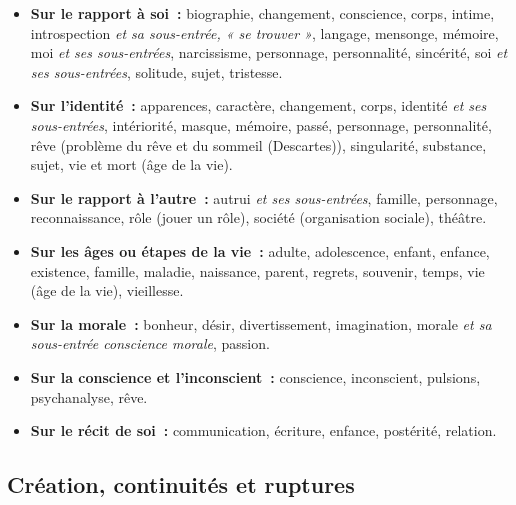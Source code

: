 \begin{itemize}\setlength{\itemsep}{6pt}

\item \textbf{Sur le rapport à soi~:} biographie, changement, conscience, corps, intime, introspection \textit{et sa sous-entrée, « se trouver »}, langage, mensonge, mémoire, moi \textit{et ses sous-entrées}, narcissisme, personnage, personnalité, sincérité, soi \textit{et ses sous-entrées}, solitude, sujet, tristesse.

\item \textbf{Sur l'identité~:} apparences, caractère, changement, corps, identité \textit{et ses sous-entrées}, intériorité, masque, mémoire, passé, personnage, personnalité, rêve (problème du rêve et du sommeil (Descartes)), singularité, substance, sujet, vie et mort (âge de la vie).

\item \textbf{Sur le rapport à l'autre~:} autrui \textit{et ses sous-entrées}, famille, personnage, reconnaissance, rôle (jouer un rôle), société (organisation sociale), théâtre.

\item \textbf{Sur les âges ou étapes de la vie~:} adulte, adolescence,  enfant, enfance, existence, famille, maladie, naissance, parent, regrets, souvenir, temps, vie (âge de la vie), vieillesse.

\item \textbf{Sur la morale~:} bonheur, désir, divertissement, imagination, morale \textit{et sa sous-entrée conscience morale}, passion.

\item \textbf{Sur la conscience et l'inconscient~:} conscience, inconscient, pulsions, psychanalyse, rêve.

\item \textbf{Sur le récit de soi~:} communication, écriture, enfance, postérité, relation.

\end{itemize}

\subsection{Création, continuités et ruptures}

